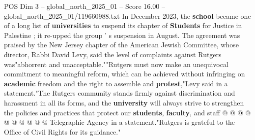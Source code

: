 \begin{textsample}{POS Dim 3 – global\_north\_2025\_01 – Score 16.00 – global\_north\_2025\_01/119660988.txt}
In December 2023, the \textbf{school} became one of a long list of \textbf{universities} to suspend its chapter of \textbf{Students} for Justice in Palestine ; it re-upped the group ' s suspension in August.
The agreement was praised by the New Jersey chapter of the American Jewish Committee, whose director, Rabbi David Levy, said the level of complaints against Rutgers was"abhorrent and unacceptable.""Rutgers must now make an unequivocal commitment to meaningful reform, which can be achieved without infringing on \textbf{academic} freedom and the right to assemble and \textbf{protest},"Levy said in a statement."The Rutgers community stands firmly against discrimination and harassment in all its forms, and the \textbf{university} will always strive to strengthen the policies and practices that protect our \textbf{students}, \textbf{faculty}, and staff @ @ @ @ @ @ @ @ @ @ Telegraphic Agency in a statement."Rutgers is grateful to the Office of Civil Rights for its guidance."

\end{textsample}
